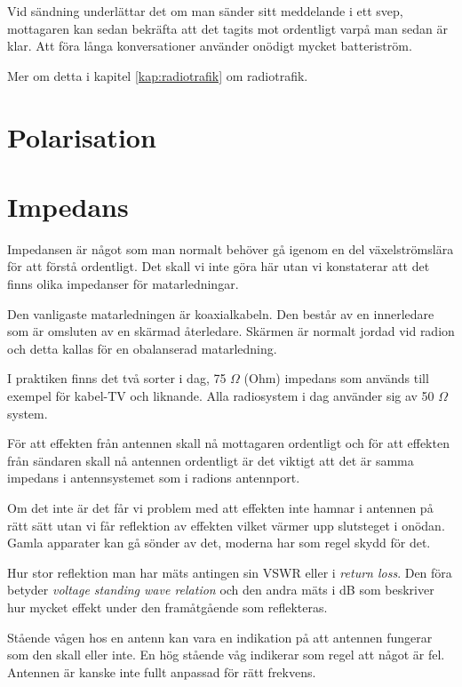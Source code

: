 \documentclass[12ypt,swedish,a4paper]{report}
\begin{document}
Vid sändning underlättar det om man sänder sitt meddelande i ett svep, mottagaren kan sedan bekräfta att det tagits mot ordentligt varpå man sedan är klar. Att föra långa konversationer använder onödigt mycket batteriström.

Mer om detta i kapitel  \ref{kap:radiotrafik} om radiotrafik.

\section{Polarisation}


\section{Impedans}

Impedansen är något som man normalt behöver gå igenom en del växelströmslära för att förstå ordentligt. Det skall vi inte göra här utan vi konstaterar att det finns olika impedanser för matarledningar.

Den vanligaste matarledningen är koaxialkabeln. Den består av en innerledare som är omsluten av en skärmad återledare. Skärmen är normalt jordad vid radion och detta kallas för en obalanserad matarledning.

I praktiken finns det två sorter i dag, 75 $\Omega$ (Ohm) impedans som används till exempel för kabel-TV och liknande. Alla radiosystem i dag använder sig av 50 $\Omega$ system. 

För att effekten från antennen skall nå mottagaren ordentligt och för att effekten från sändaren skall nå antennen ordentligt är det viktigt att det är samma impedans i antennsystemet som i radions antennport.

Om det inte är det får vi problem med att effekten inte hamnar i antennen på rätt sätt utan vi får reflektion av effekten vilket värmer upp slutsteget i onödan. Gamla apparater kan gå sönder av det, moderna har som regel skydd för det.

Hur stor reflektion man har mäts antingen sin VSWR eller i \textit{return loss}. Den föra betyder \textit{voltage standing wave relation} och den andra mäts i dB som beskriver hur mycket effekt under den framåtgående som reflekteras.

Stående vågen hos en antenn kan vara en indikation på att antennen fungerar som den skall eller inte. En hög stående våg indikerar som regel att något är fel. Antennen är kanske inte fullt anpassad för rätt frekvens.
\end{document}
